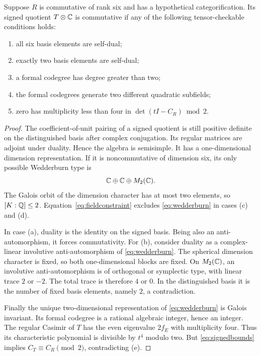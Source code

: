 \begin{proposition}\label{prop:descent}
Suppose $R$ is commutative of rank six and has a hypothetical
categorification. Its signed quotient $T\otimes\mathbb C$ is commutative if
any of the following tensor-checkable conditions holds:
\begin{enumerate}[label=(\alph*)]
\item all six basis elements are self-dual;
\item exactly two basis elements are self-dual;
\item a formal codegree has degree greater than two;
\item the formal codegrees generate two different quadratic subfields;
\item zero has multiplicity less than four in
$\det(tI-C_R)\bmod2$.
\end{enumerate}
\end{proposition}
\begin{proof}
The coefficient-of-unit pairing of a signed quotient is still positive
definite on the distinguished basis after complex conjugation. Its
regular matrices are adjoint under duality. Hence the algebra is
semisimple. It has a one-dimensional dimension representation. If it
is noncommutative of dimension six, its only possible Wedderburn type is
\begin{equation}\label{eq:wedderburn}
 \mathbb C\oplus\mathbb C\oplus M_2(\mathbb C).
\end{equation}
The Galois orbit of the dimension character has at most two elements,
so $[K:\mathbb Q]\le2$. Equation~\eqref{eq:fieldconstraint} excludes
\eqref{eq:wedderburn} in cases (c) and (d).

In case (a), duality is the identity on the signed basis. Being also an
anti-automorphism, it forces commutativity. For (b), consider duality as
a complex-linear involutive anti-automorphism of
\eqref{eq:wedderburn}. The spherical dimension character is fixed, so
both one-dimensional blocks are fixed. On $M_2(\mathbb C)$, an involutive
anti-automorphism is of orthogonal or symplectic type, with linear trace
$2$ or $-2$. The total trace is therefore $4$ or $0$. In the distinguished
basis it is the number of fixed basis elements, namely $2$, a
contradiction.

Finally the unique two-dimensional representation of
\eqref{eq:wedderburn} is Galois invariant. Its formal codegree is a
rational algebraic integer, hence an integer. The regular Casimir of
$T$ has the even eigenvalue $2f_E$ with multiplicity four. Thus its
characteristic polynomial is divisible by $t^4$ modulo two. But
\eqref{eq:signedbounds} implies $C_T\equiv C_R\pmod2$, contradicting
(e).
\end{proof}

